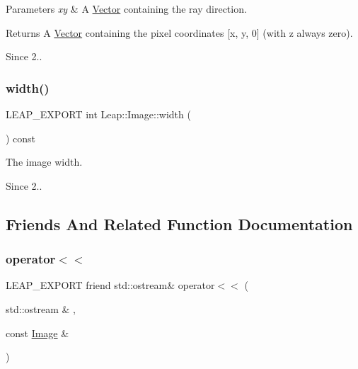 \begin{DoxyParams}{Parameters}
{\em xy} & A \hyperlink{struct_leap_1_1_vector}{Vector} containing the ray direction. \\
\hline
\end{DoxyParams}
\begin{DoxyReturn}{Returns}
A \hyperlink{struct_leap_1_1_vector}{Vector} containing the pixel coordinates \mbox{[}x, y, 0\mbox{]} (with z always zero). 
\end{DoxyReturn}
\begin{DoxySince}{Since}
2.. 
\end{DoxySince}
\mbox{\label{class_leap_1_1_image_adfca7fee0ab396da733d084946e1de0f}} 
\subsubsection{\texorpdfstring{width()}{width()}}
{\footnotesize\ttfamily L\+E\+A\+P\+\_\+\+E\+X\+P\+O\+RT int Leap\+::\+Image\+::width (\begin{DoxyParamCaption}{ }\end{DoxyParamCaption}) const}

The image width.


\begin{DoxyCodeInclude}
\end{DoxyCodeInclude}


\begin{DoxySince}{Since}
2.. 
\end{DoxySince}


\subsection{Friends And Related Function Documentation}
\mbox{\label{class_leap_1_1_image_acb3061d938151f14c3f2b35c2089f730}} 
\subsubsection{\texorpdfstring{operator$<$$<$}{operator<<}}
{\footnotesize\ttfamily L\+E\+A\+P\+\_\+\+E\+X\+P\+O\+RT friend std\+::ostream\& operator$<$$<$ (\begin{DoxyParamCaption}\item[{std\+::ostream \&}]{,  }\item[{const \hyperlink{class_leap_1_1_image}{Image} \&}]{ }\end{DoxyParamCaption})\hspace{0.3cm}{\ttfamily [friend]}}

